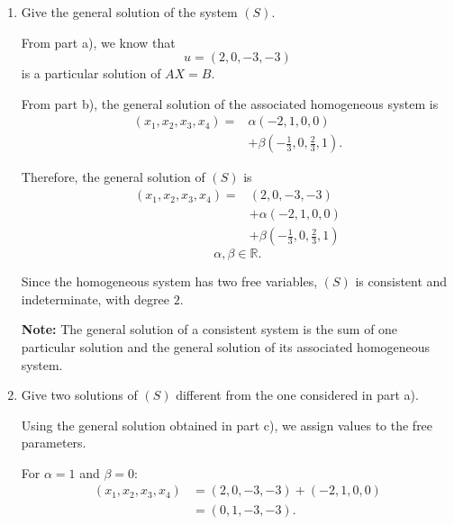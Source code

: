\begin{enumerate}[label=\alph*)]
\begin{answer}
    \textbf{General solution of the associated homogeneous system}

    $$
    \boxed{
    \begin{aligned}
    (x_1,x_2,x_3,x_4)
    ={}&\alpha(-2,1,0,0)\\
    &+\beta\left(-\frac13,0,
    \frac23,1\right)
    \end{aligned}
    }
    $$
    $$
    \alpha,\beta\in\mathbb R.
    $$
\end{answer}

\item Give the general solution of the system $(S)$.

\begin{answer}
    From part a), we know that
    $$
    u=(2,0,-3,-3)
    $$
    is a particular solution of $AX=B$.

    From part b), the general solution of the associated homogeneous system is
    $$
    \begin{aligned}
    (x_1,x_2,x_3,x_4)
    ={}&\alpha(-2,1,0,0)\\
    &+\beta\left(-\frac13,0,
    \frac23,1\right).
    \end{aligned}
    $$

    Therefore, the general solution of $(S)$ is
    $$
    \boxed{
    \begin{aligned}
    (x_1,x_2,x_3,x_4)
    ={}&(2,0,-3,-3)\\
    &+\alpha(-2,1,0,0)\\
    &+\beta\left(-\frac13,0,
    \frac23,1\right)
    \end{aligned}
    }
    $$
    $$
    \alpha,\beta\in\mathbb R.
    $$

    Since the homogeneous system has two free variables, $(S)$ is consistent and
    indeterminate, with degree $2$.

    {\color{red}
    \textbf{Note:} The general solution of a consistent system is the sum of one particular solution
    and the general solution of its associated homogeneous system.}
\end{answer}

\item Give two solutions of $(S)$
different from the one considered
in part a).

\begin{answer}
    Using the general solution obtained in part c), we assign values to the free parameters.

    For $\alpha=1$ and $\beta=0$:
    $$
    \begin{aligned}
    (x_1,x_2,x_3,x_4)
    &=(2,0,-3,-3)+(-2,1,0,0)\\
    &=\boxed{(0,1,-3,-3)}.
    \end{aligned}
    $$


\end{answer}
\end{enumerate}
